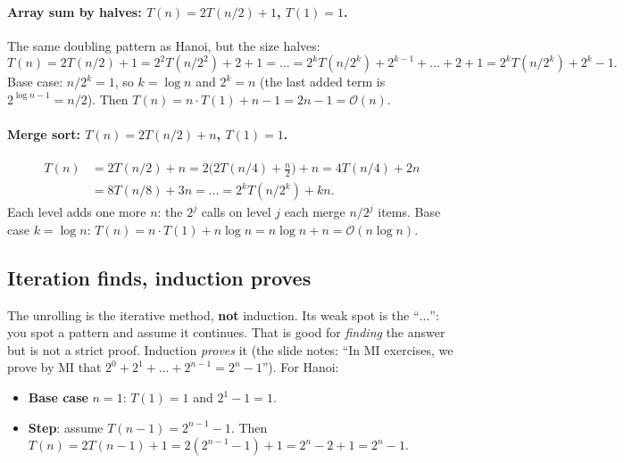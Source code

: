 \documentclass{fkt-notes}
\newcommand{\Oh}{\mathcal{O}}
\begin{document}
\paragraph{Array sum by halves: $T(n)=2T(n/2)+1$, $T(1)=1$.} The same doubling pattern as Hanoi, but the size halves:
\[
T(n)=2T(n/2)+1=2^2T(n/2^2)+2+1=\dots=2^kT(n/2^k)+2^{k-1}+\dots+2+1=2^kT(n/2^k)+2^k-1.
\]
Base case: $n/2^k=1$, so $k=\log n$ and $2^k=n$ (the last added term is $2^{\log n-1}=n/2$). Then $T(n)=n\cdot T(1)+n-1=2n-1=\Oh(n)$.

\paragraph{Merge sort: $T(n)=2T(n/2)+n$, $T(1)=1$.}
\begin{align*}
T(n) &= 2T(n/2)+n = 2\big(2T(n/4)+\tfrac n2\big)+n = 4T(n/4)+2n\\
     &= 8T(n/8)+3n = \dots = 2^kT(n/2^k)+kn.
\end{align*}
Each level adds one more $n$: the $2^j$ calls on level $j$ each merge $n/2^j$ items. Base case $k=\log n$: $T(n)=n\cdot T(1)+n\log n=n\log n+n=\Oh(n\log n)$.

\subsection{Iteration finds, induction proves}

The unrolling is the iterative method, \textbf{not} induction. Its weak spot is the ``$\dots$'': you spot a pattern and assume it continues. That is good for \emph{finding} the answer but is not a strict proof. Induction \emph{proves} it (the slide notes: ``In MI exercises, we prove by MI that $2^0+2^1+\dots+2^{n-1}=2^n-1$''). For Hanoi:
\begin{itemize}[leftmargin=1.5em,itemsep=1pt]
  \item \textbf{Base case} $n=1$: $T(1)=1$ and $2^1-1=1$. \checkmark
  \item \textbf{Step}: assume $T(n-1)=2^{n-1}-1$. Then $T(n)=2T(n-1)+1=2(2^{n-1}-1)+1=2^n-2+1=2^n-1$. \checkmark
\end{itemize}
\end{document}
